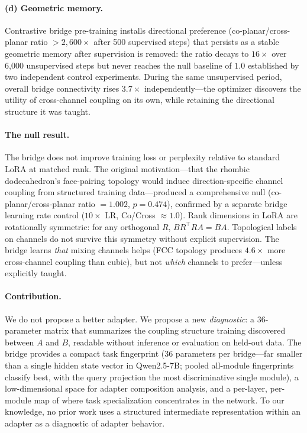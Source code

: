 \paragraph{(d) Geometric memory.}
Contrastive bridge pre-training installs directional preference
(co-planar/cross-planar ratio $> 2{,}600\times$ after 500 supervised
steps) that persists as a stable geometric memory after supervision is
removed: the ratio decays to $16\times$ over 6{,}000 unsupervised steps
but never reaches the null baseline of $1.0$ established by two
independent control experiments. During the same unsupervised period,
overall bridge connectivity rises $3.7\times$ independently---the
optimizer discovers the utility of cross-channel coupling on its own,
while retaining the directional structure it was taught.

\paragraph{The null result.}
The bridge does not improve training loss or perplexity relative to
standard LoRA at matched rank.
The original motivation---that the rhombic dodecahedron's face-pairing
topology would induce direction-specific channel coupling from
structured training data---produced a comprehensive null
(co-planar/cross-planar ratio $= 1.002$, $p = 0.474$), confirmed by
a separate bridge learning rate control ($10\times$ LR, Co/Cross
$\approx 1.0$).
Rank dimensions in LoRA are rotationally symmetric: for any orthogonal
$R$, $B R^\top R A = BA$.
Topological labels on channels do not survive this symmetry without
explicit supervision.
The bridge learns \emph{that} mixing channels helps (FCC topology
produces $4.6\times$ more cross-channel coupling than cubic), but not
\emph{which} channels to prefer---unless explicitly taught.

\paragraph{Contribution.}
We do not propose a better adapter.
We propose a new \emph{diagnostic}: a 36-parameter matrix that
summarizes the coupling structure training discovered between $A$ and
$B$, readable without inference or evaluation on held-out data.
The bridge provides a compact task fingerprint (36 parameters per
bridge---far smaller than a single hidden state vector in
Qwen2.5-7B; pooled all-module fingerprints classify best, with the
query projection the most discriminative single module), a
low-dimensional space for adapter composition
analysis, and a per-layer, per-module map of where task specialization
concentrates in the network.
To our knowledge, no prior work uses a structured intermediate
representation within an adapter as a diagnostic of adapter behavior.


